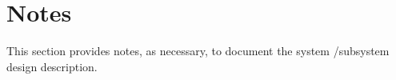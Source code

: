 
\chapter{Notes}
\label{loc:Notes}


This section provides notes, as necessary, to document the system /subsystem design description.